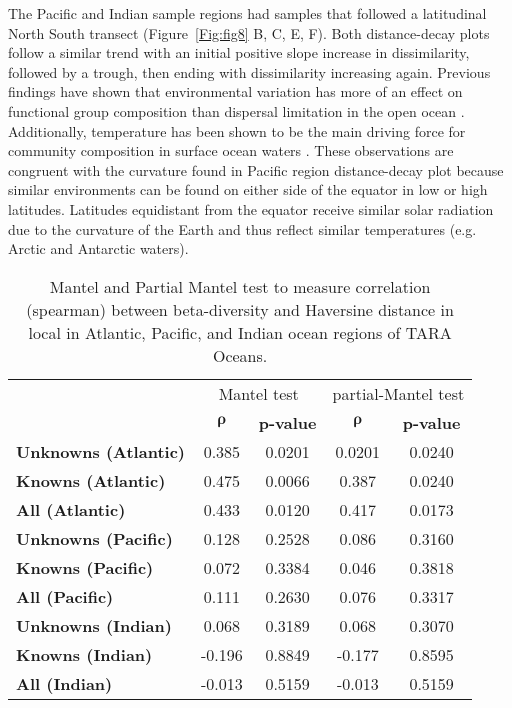 The Pacific and Indian sample regions had samples that followed a latitudinal North South transect (Figure~\ref{Fig:fig8} B, C, E, F). Both distance-decay plots follow a similar trend with an initial positive slope increase in dissimilarity, followed by a trough, then ending with dissimilarity increasing again. Previous findings have shown that environmental variation has more of an effect on functional group composition than dispersal limitation in the open ocean \citep{Louca_2016}. Additionally, temperature has been shown to be the main driving force for community composition in surface ocean waters \citep{Sunagawa_2015}. These observations are congruent with the curvature found in Pacific region distance-decay plot because similar environments can be found on either side of the equator in low or high latitudes. Latitudes equidistant from the equator receive similar solar radiation due to the curvature of the Earth and thus reflect similar temperatures (e.g. Arctic and Antarctic waters).\\

\begin{table}[]
\centering
\caption{Mantel and Partial Mantel test to measure correlation (spearman) between beta-diversity and Haversine distance in local in Atlantic, Pacific, and Indian ocean regions of TARA Oceans.}
\label{table:3.5}
\begin{tabular}{@{}lcccc@{}}
\cmidrule[\heavyrulewidth](l){2-5}
                              & \multicolumn{2}{c}{Mantel test}  & \multicolumn{2}{c}{partial-Mantel test} \\ \cmidrule(l){2-5}
                              & {$\bm{\rho}$} & \textbf{p-value} & {$\bm{\rho}$}     & \textbf{p-value}    \\ \midrule
\textbf{Unknowns (Atlantic)}  & 0.385 & 0.0201 & 0.0201 & 0.0240             \\
\textbf{Knowns (Atlantic)} & 0.475 & 0.0066 & 0.387 & 0.0240 \\
\textbf{All (Atlantic)} & 0.433 & 0.0120 & 0.417 & 0.0173 \\ \midrule
\textbf{Unknowns (Pacific)}  & 0.128 & 0.2528 & 0.086 & 0.3160 \\
\textbf{Knowns (Pacific)}  & 0.072 & 0.3384 & 0.046 & 0.3818 \\
\textbf{All (Pacific)}  & 0.111 & 0.2630 & 0.076 & 0.3317 \\ \midrule
\textbf{Unknowns (Indian)} & 0.068 & 0.3189 & 0.068 & 0.3070 \\
\textbf{Knowns (Indian)} & -0.196 & 0.8849 & -0.177 & 0.8595 \\
\textbf{All (Indian)} & -0.013 & 0.5159 & -0.013 & 0.5159 \\\bottomrule
\end{tabular}
\end{table}


